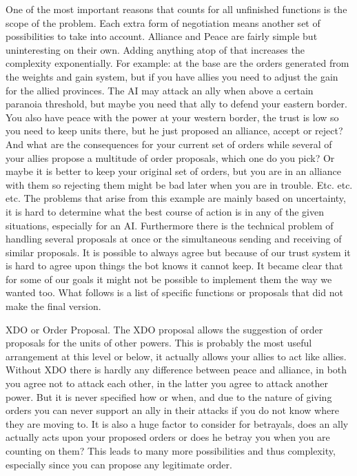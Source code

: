 \documentclass[a4paper]{article} %
\begin{document}
One of the most important reasons that counts for all unfinished functions is the scope of the problem. Each extra form of negotiation means another set of possibilities to take into account. Alliance and Peace are fairly simple but uninteresting on their own. Adding anything atop of that increases the complexity exponentially. For example: at the base are the orders generated from the weights and gain system, but if you have allies you need to adjust the gain for the allied provinces. The AI may attack an ally when above a certain paranoia threshold, but maybe you need that ally to defend your eastern border. You also have peace with the power at your western border, the trust is low so you need to keep units there, but he just proposed an alliance, accept or reject? And what are the consequences for your current set of orders while several of your allies propose a multitude of order proposals, which one do you pick? Or maybe it is better to keep your original set of orders, but you are in an alliance with them so rejecting them might be bad later when you are in trouble. Etc. etc. etc. The problems that arise from this example are mainly based on uncertainty, it is hard to determine what the best course of action is in any of the given situations, especially for an AI. Furthermore there is the technical problem of handling several proposals at once or the simultaneous  sending and receiving of similar proposals. It is possible to always agree but because of our trust system it is hard to agree upon things the bot knows it cannot keep. It became clear that for some of our goals it might not be possible to implement them the way we wanted too. What follows is a list of specific functions or proposals that did not make the final version.

XDO or Order Proposal. The XDO proposal allows the suggestion of order proposals for the units of other powers.  This is probably the most useful arrangement at this level or below, it actually allows your allies to act like allies. Without XDO there is hardly any difference between peace and alliance, in both you agree not to attack each other, in the latter you agree to attack another power. But it is never specified how or when, and due to the nature of giving orders you can never support an ally in their attacks if you do not know where they are moving to. It is also a huge factor to consider for betrayals, does an ally actually acts upon your proposed orders or does he betray you when you are counting on them? This leads to many more possibilities and thus complexity, especially since you can propose any legitimate order.
\end{document}
